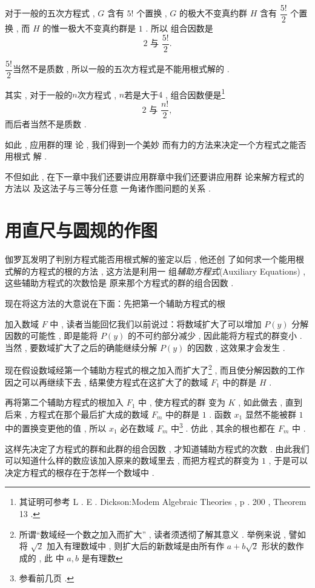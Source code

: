 对于一般的五次方程式 ,  $G$ 含有 $5!$ 个置换 ,  $G$ 的极大不变真约群 $H$ 含有 $\dfrac{5!}{2}$ 个置换 ,  而 $H$ 的惟一极大不变真约群是 $1$  . 所以
组合因数是
\[
2 \text { 与 }\dfrac{5!}{2} . 
\]

$\dfrac{5!}{2}$当然不是质数 , 所以一般的五次方程式是不能用根式解的 . 

其实 , 对于一般的$n$次方程式 , $n$若是大于$4$ , 组合因数便是\footnote{其证明可参考 L .  E . Dickson:Modem Algebraic Theories , p . 200 , Theorem 13 . }
\[
2 \text { 与 }\dfrac{n!}{2} , 
\]
而后者当然不是质数 . 

如此 , 应用群的理 论 , 我们得到一个美妙 而有力的方法来决定一个方程式之能否用根式 解 . 

不但如此 , 在下一章中我们还要讲应用群章中我们还要讲应用群 论来解方程式的方法以 及这法子与三等分任意 一角诸作图问题的关系 . 

\section{用直尺与圆规的作图}

伽罗瓦发明了判别方程式能否用根式解的鉴定以后 , 他还创 了如何求一个能用根式解的方程式的根的方法 , 这方法是利用一 组\emph{辅助方程式}(Auxiliary Equations) , 这些辅助方程式的次数恰是 原来那个方程式的群的组合因数 . 

现在将这方法的大意说在下面：先把第一个辅助方程式的根

加入数域 $F$ 中 , 读者当能回忆我们以前说过：将数域扩大了可以增加 $P(y)$ 分解因数的可能性 ,  即是能将 $P(y)$ 的不可约部分减少 , 因此能将方程式的群变小 . 当然 , 要数域扩大了之后的确能继续分解 $P(y)$ 的因数 , 这效果才会发生 . 

现在假设数域经第一个辅助方程式的根之加入而扩大了\footnote{所谓“数域经一个数之加入而扩大” , 读者须透彻了解其意义 . 举例来说 , 譬如将 $\sqrt{2}$ 加入有理数域中 , 则扩大后的新数域是由所有作 $a+b \sqrt{2}$ 形状的数作成的 ,  此 中 $a ,  b$ 是有理数} , 而且使分解因数的工作因之可以再继续下去 , 结果使方程式在这扩大了的数域 $F_{1}$ 中的群是 $H$ . 

再将第二个辅助方程式的根加入 $F_{1}$ 中 , 使方程式的群 变为 $K$ ,  如此做去 , 直到后来 , 方程式在那个最后扩大成的数域 $F_{m}$ 中的群是 $1$  . 函数 $x_{1}$ 显然不能被群 $1$ 中的置换变更他的值 , 所以 $x_{1}$ 必在数域 $F_{m}$ 中\footnote{参看前几页 . } . 仿此 , 其余的根也都在 $F_{m}$ 中 . 

这样先决定了方程式的群和此群的组合因数 , 才知道辅助方程式的次数 . 由此我们可以知道什么样的数应该加入原来的数域里去 , 而把方程式的群变为 $1$  ,  于是可以决定方程式的根存在于怎样一个数域中 . 

